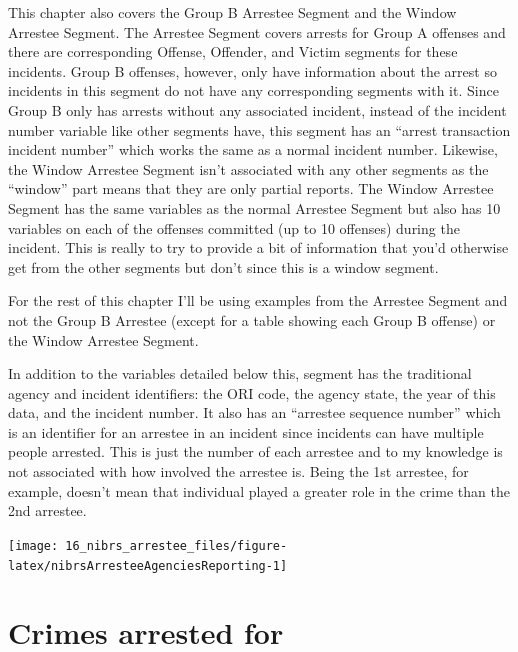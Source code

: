 \documentclass[
]{krantz}
\let\origfigure\figure
\let\endorigfigure\endfigure
\renewenvironment{figure}[1][2] {
    \expandafter\origfigure\expandafter[H]
} {
    \endorigfigure
}
\begin{document}
This chapter also covers the Group B Arrestee Segment and
the Window Arrestee Segment. The Arrestee Segment covers
arrests for Group A offenses and there are corresponding
Offense, Offender, and Victim segments for these incidents.
Group B offenses, however, only have information about the
arrest so incidents in this segment do not have any
corresponding segments with it. Since Group B only has
arrests without any associated incident, instead of the
incident number variable like other segments have, this
segment has an ``arrest transaction incident number'' which
works the same as a normal incident number. Likewise, the
Window Arrestee Segment isn't associated with any other
segments as the ``window'' part means that they are only
partial reports. The Window Arrestee Segment has the same
variables as the normal Arrestee Segment but also has 10
variables on each of the offenses committed (up to 10
offenses) during the incident. This is really to try to
provide a bit of information that you'd otherwise get from
the other segments but don't since this is a window segment.

For the rest of this chapter I'll be using examples from the
Arrestee Segment and not the Group B Arrestee (except for a
table showing each Group B offense) or the Window Arrestee
Segment.

In addition to the variables detailed below this, segment
has the traditional agency and incident identifiers: the ORI
code, the agency state, the year of this data, and the
incident number. It also has an ``arrestee sequence number''
which is an identifier for an arrestee in an incident since
incidents can have multiple people arrested. This is just
the number of each arrestee and to my knowledge is not
associated with how involved the arrestee is. Being the 1st
arrestee, for example, doesn't mean that individual played a
greater role in the crime than the 2nd arrestee.

\begin{figure}

{\centering \texttt{[image: 16\_nibrs\_arrestee\_files/figure-latex/nibrsArresteeAgenciesReporting-1]} 

}

\caption{The annual number of agencies reporting data in the NIBRS Arrestee and Group B Arrestee Segments, 1991-2022.}\label{fig:nibrsArresteeAgenciesReporting}
\end{figure}

\section{Crimes arrested for}\label{crimes-arrested-for}
\end{document}
